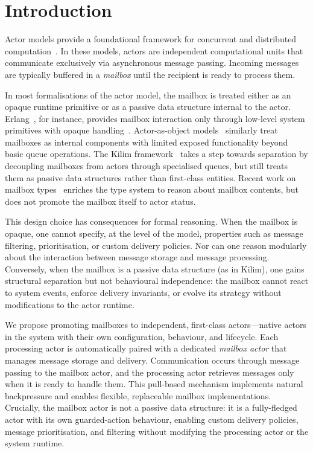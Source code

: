 \documentclass[
  a4paper,        %
  techreport,     %
]{art}
\begin{document}
\maketitle

\section{Introduction}

Actor models provide a foundational framework for concurrent and distributed
computation~\cite{Hewitt1973,Agha1986,foundation97agha}. In these models,
actors are independent computational units that communicate exclusively via
asynchronous message passing. Incoming messages are typically buffered in a
\emph{mailbox} until the recipient is ready to process them.

In most formalisations of the actor model, the mailbox is treated either as an
opaque runtime primitive or as a passive data structure internal to the actor.
Erlang~\cite{erlang-2010}, for instance, provides mailbox interaction only
through low-level system primitives with opaque
handling~\cite{formal-semantics-erlang}. Actor-as-object
models~\cite{taxonomy-of-actor-models} similarly treat mailboxes as internal
components with limited exposed functionality beyond basic queue operations. The
Kilim framework~\cite{kilim-framework} takes a step towards separation by
decoupling mailboxes from actors through specialised queues, but still treats
them as passive data structures rather than first-class entities. Recent work on
mailbox types~\cite{special-delivery-mailbox-types-2023} enriches the type
system to reason about mailbox contents, but does not promote the mailbox itself
to actor status.

This design choice has consequences for formal reasoning. When the mailbox is
opaque, one cannot specify, at the level of the model, properties such as
message filtering, prioritisation, or custom delivery policies. Nor can one
reason modularly about the interaction between message storage and message
processing. Conversely, when the mailbox is a passive data structure
(as in Kilim), one gains structural separation but not behavioural
independence: the mailbox cannot react to system events, enforce delivery
invariants, or evolve its strategy without modifications to the actor runtime.

We propose promoting mailboxes to independent, first-class actors---native
actors in the system with their own configuration, behaviour, and lifecycle.
Each processing actor is automatically paired with a dedicated \emph{mailbox
actor} that manages message storage and delivery. Communication occurs through
message passing to the mailbox actor, and the processing actor retrieves
messages only when it is ready to handle them. This pull-based mechanism
implements natural backpressure and enables flexible, replaceable mailbox
implementations. Crucially, the mailbox actor is not a passive data
structure: it is a fully-fledged actor with its own guarded-action behaviour,
enabling custom delivery policies, message prioritisation, and filtering
without modifying the processing actor or the system runtime.
\end{document}
